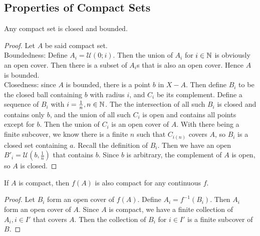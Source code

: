 \documentclass[12pt]{article}
\begin{document}
\subsection{Properties of Compact Sets}

\begin{prop}
    Any compact set is closed and bounded.
\end{prop}

\begin{proof}
    Let $A$ be said compact set. \\
    Boundedness: Define $A_i = \mathcal U(0; i)$. Then the union of $A_i$ for $i \in \mathbb{N}$ is obviously an open cover. Then there is a subset of $A_i$s that is also an open cover. Hence $A$ is bounded. \\
    Closedness: since $A$ is bounded, there is a point $b$ in $X - A$. Then define $B_i$ to be the closed ball containing $b$ with radius $i$, and $C_i$ be its complement. Define a sequence of $B_i$ with $i = \frac{1}{n}, n \in \mathbb{N}$. The the intersection of all such $B_i$ is closed and contains only $b$, and the union of all such $C_i$ is open and contains all points except for $b$. Then the union of $C_i$ is an open cover of $A$. With there being a finite subcover, we know there is a finite $n$ such that $C_{i(n)}$ covers $A$, so $B_i$ is a closed set containing $a$. Recall the definition of $B_i$. Then we have an open $B'_i = \mathcal U\left(b,\frac{1}{n}\right)$ that contains $b$. Since $b$ is arbitrary, the complement of $A$ is open, so $A$ is closed.
\end{proof}

\begin{prop}
    If $A$ is compact, then $f(A)$ is also compact for any continuous $f$.
\end{prop}

\begin{proof}
    Let $B_i$ form an open cover of $f(A)$. Define $A_i = f^{-1}(B_i)$. Then $A_i$ form an open cover of $A$. Since $A$ is compact, we have a finite collection of $A_i, i \in I'$ that covers $A$. Then the collection of $B_i$ for $i \in I'$ is a finite subcover of $B$.
\end{proof}
\end{document}

